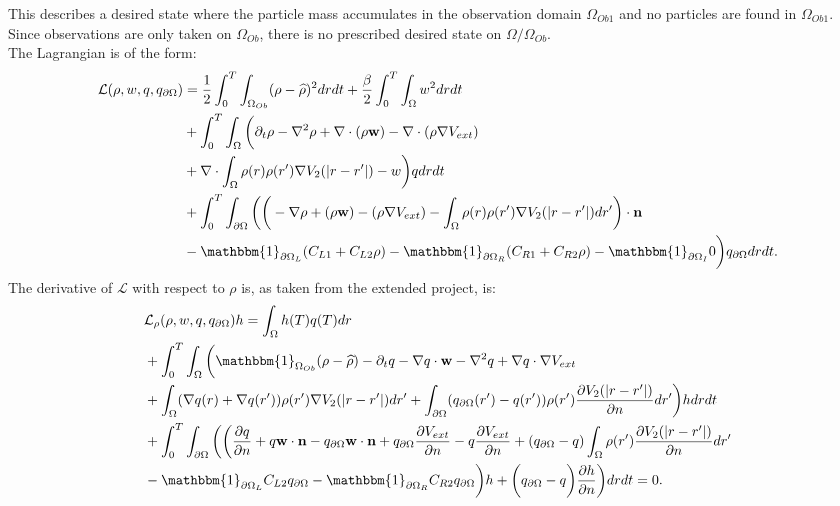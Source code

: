 This describes a desired state where the particle mass accumulates in the observation domain $\Omega_{Ob1}$ and no particles are found in $\Omega_{Ob1}$. Since observations are only taken on $\Omega_{Ob}$, there is no prescribed desired state on $\Omega / \Omega_{Ob}$.\\
The Lagrangian is of the form:
\begin{align*}
\mathcal{L}(\Sta,w,\Adjb,\Adjc ) &=\frac{1}{2} \int_0^T \int_{\Omega_{Ob}} (\Sta - \widehat \Sta)^2 dr dt + \frac{\beta}{2}\int_0^T \int_\Omega w^2 drdt \\
&+ \int_0^T \int_\Omega \bigg( \partial_t \rho - \nabla^2 \rho + \nabla \cdot (\rho \mathbf{w}) -\nabla \cdot (\rho \nabla V_{ext}) \\
&+ \nabla \cdot \int_\Omega \rho(r) \rho(r') \nabla V_2(|r-r'|) -w \bigg) \Adjb dr dt\\
&+ \int_0^T \int_{\partial \Omega} \bigg(  \bigg(-\nabla \rho+ (\rho \mathbf{w}) -(\rho \nabla V_{ext}) -  \int_\Omega \rho(r) \rho(r') \nabla V_2(|r-r'|) dr' \bigg)\cdot \nor\\
&  -\mathbbm{1}_{\partial \Omega_L}( C_{L1}  + C_{L2}\Sta) -\mathbbm{1}_{\partial \Omega_R} ( C_{R1}  + C_{R2}\Sta) -\mathbbm{1}_{\partial \Omega_I} 0 \bigg) \Adjc dr dt.
\end{align*}
The derivative of $\mathcal{L}$ with respect to $\rho$ is, as taken from the extended project, is:
\begin{align*}
&\mathcal{L}_\rho (\rho,{w},\Adjb,\Adjc)h=
\int_\Omega h(T) \Adjb(T) dr\\
&+ \int_0^T \int_\Omega \bigg( \mathbbm{1}_{ \Omega_{Ob}} (\rho- \widehat{\rho})  - \partial_t \Adjb  - \nabla \Adjb \cdot \mathbf{w}  - \nabla^2 \Adjb \notag 
+  \nabla \Adjb \cdot \nabla V_{ext}  \notag \\
&+ \int_\Omega (\nabla  \Adjb(r)+\nabla  \Adjb(r')) \rho(r') \nabla V_2(|r-r'|) dr'+ \int_{\partial \Omega} ( \Adjc(r') - \Adjb(r')) \rho(r')   \frac{\partial V_2(|r-r'|)}{\partial n} dr' \bigg) h dr dt \\
&+  \int_0^T\int_{\partial \Omega}  \bigg(
\bigg(\frac{\partial \Adjb }{\partial n} + \Adjb  \mathbf{w} \cdot \mathbf{n} - \Adjc \mathbf{w} \cdot \mathbf{n}  +  \Adjc \dfrac{\partial V_{ext}}{\partial n} - \Adjb \frac{\partial V_{ext}}{\partial n} + ( \Adjc - \Adjb)  \int_\Omega \rho(r') \frac{\partial V_2(|r-r'|)}{\partial n} dr'\\
& -\mathbbm{1}_{\partial \Omega_L} C_{L2} \Adjc   -\mathbbm{1}_{\partial \Omega_R} C_{R2} \Adjc \bigg)h + \bigg( \Adjc- \Adjb \bigg) \frac{\partial h}{\partial n} \bigg) dr dt =0.
\end{align*}
